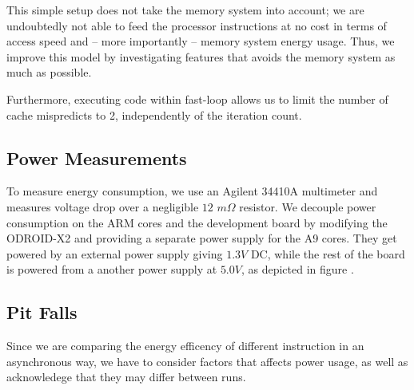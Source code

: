 This simple setup does not take the memory system into account; we are
undoubtedly not able to feed the processor instructions at no cost in terms of
access speed and -- more importantly -- memory system energy usage. Thus, we
improve this model by investigating features that avoids the memory system as
much as possible.

Furthermore, executing code within fast-loop allows us to limit the number of
cache mispredicts to 2, independently of the iteration count.


\subsection{Power Measurements}
To measure energy consumption, we use an Agilent 34410A multimeter and measures
voltage drop over a negligible $12$ $m\Omega$ resistor. We decouple power
consumption on the ARM cores and the development board by modifying the
ODROID-X2 and providing a separate power supply for the A9 cores. They get
powered by an external power supply giving $1.3V$ DC, while the rest of the
board is powered from a another power supply at $5.0V$, as depicted in figure
.

\subsection{Pit Falls}
Since we are comparing the energy efficency of different instruction in an asynchronous
way, we have to consider factors that affects power usage, as well as acknowledege that
they may differ between runs.

